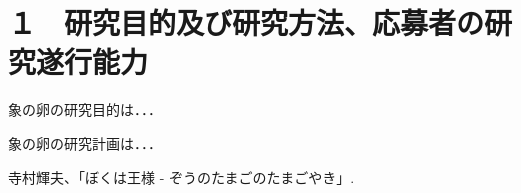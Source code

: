 
\section{１　研究目的及び研究方法、応募者の研究遂行能力}

\JSPSInstructions	%

	 象の卵の研究目的は．．．

	象の卵の研究計画は．．．

	\vspace{1cm}
	\begin{thebibliography}{99}
		 寺村輝夫、「ぼくは王様 - ぞうのたまごのたまごやき」.
	\end{thebibliography}


